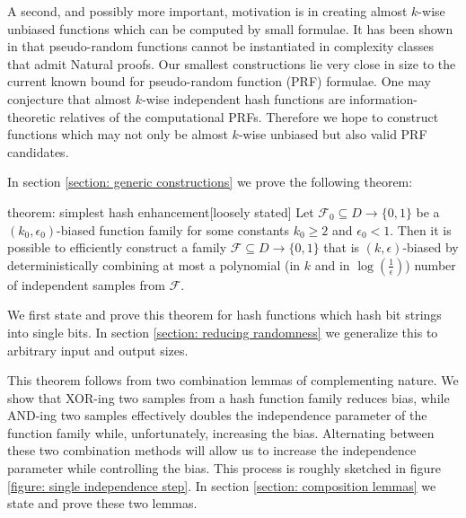 \documentclass[12pt]{article}
\newcommand{\F}{\mathcal{F}}
\begin{document}
	A second, and possibly more important, motivation is in creating almost $k$-wise unbiased functions which can be computed by small formulae.
	It has been shown in \cite{NaturalProofs} that pseudo-random functions cannot be instantiated in complexity classes that admit Natural proofs.
	Our smallest constructions lie very close in size to the current known bound for pseudo-random function (PRF) formulae.
	One may conjecture that almost $k$-wise independent hash functions are information-theoretic relatives of the computational PRFs.
	Therefore we hope to construct functions which may not only be almost $k$-wise unbiased but also valid PRF candidates.
	
	In section \ref{section: generic constructions} we prove the following theorem:
	\begin{reptheorem}{theorem: simplest hash enhancement}[loosely stated] \label{theorem: basic theorem}
		Let $\F_0 \subseteq D \rightarrow \{0,1\}$ be a $(k_0, \epsilon_0)$-biased function family for some constants $k_0 \geq 2$ and $\epsilon_0 < 1$.
		Then it is possible to efficiently construct a family $\F \subseteq D \rightarrow \{0,1\}$ that is $(k, \epsilon)$-biased by deterministically combining at most a polynomial (in $k$ and in $\log(\frac{1}{\epsilon})$) number of independent samples from $\F$.
	\end{reptheorem}
	We first state and prove this theorem for hash functions which hash bit strings into single bits.
	In section \ref{section: reducing randomness} we generalize this to arbitrary input and output sizes.
	
	This theorem follows from two combination lemmas of complementing nature.
	We show that XOR-ing two samples from a hash function family reduces bias, while AND-ing two samples effectively doubles the independence parameter of the function family while, unfortunately, increasing the bias.
	Alternating between these two combination methods will allow us to increase the independence parameter while controlling the bias.
	This process is roughly sketched in figure \ref{figure: single independence step}.
	In section \ref{section: composition lemmas} we state and prove these two lemmas.
	
\end{document}
